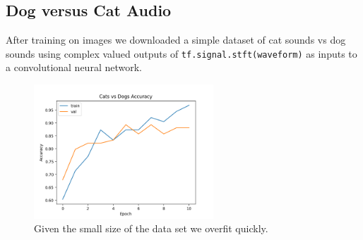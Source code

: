 \documentclass{article}
\begin{document}
\subsection{Dog versus Cat Audio}
After training on images we downloaded a simple dataset of cat sounds vs dog sounds using complex valued outputs of \texttt{tf.signal.stft(waveform)} as inputs to a convolutional neural network.
\begin{figure}[H]
  \centering
  \includegraphics[width=0.6\textwidth]{../figs/cats_dogs_accuracy.png}
  \caption{Given the small size of the data set we overfit quickly.}
\end{figure}
\newpage
\printbibliography
\end{document}
